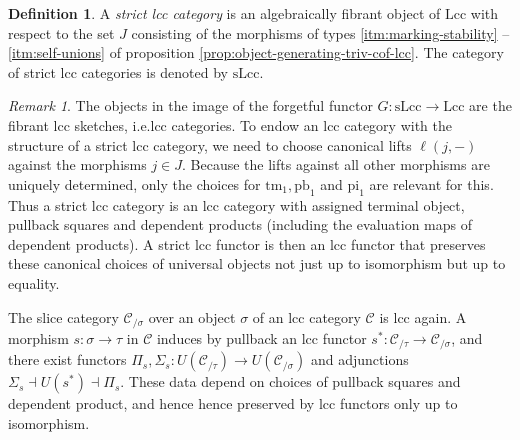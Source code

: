 \documentclass[a4paper]{article}
\theoremstyle{remark}
\newtheorem{remark}[theorem]{Remark}
\theoremstyle{definition}
\newtheorem{definition}[theorem]{Definition}
\begin{document}
\begin{definition}
  A \emph{strict lcc category} is an algebraically fibrant object of $\mathrm{Lcc}$ with respect to the set $J$ consisting of the morphisms of types \ref{itm:marking-stability} -- \ref{itm:self-unions} of proposition \ref{prop:object-generating-triv-cof-lcc}.
  The category of strict lcc categories is denoted by $\mathrm{sLcc}$.
\end{definition}

\begin{remark}
  The objects in the image of the forgetful functor $G : \mathrm{sLcc} \rightarrow \mathrm{Lcc}$ are the fibrant lcc sketches, i.e.\@ lcc categories.
  To endow an lcc category with the structure of a strict lcc category, we need to choose canonical lifts $\ell(j, -)$ against the morphisms $j \in J$.
  Because the lifts against all other morphisms are uniquely determined, only the choices for $\mathrm{tm}_1, \mathrm{pb}_1$ and $\mathrm{pi}_1$ are relevant for this.
  Thus a strict lcc category is an lcc category with assigned terminal object, pullback squares and dependent products (including the evaluation maps of dependent products).
  A strict lcc functor is then an lcc functor that preserves these canonical choices of universal objects not just up to isomorphism but up to equality.
\end{remark}

The slice category $\mathcal{C}_{/ \sigma}$ over an object $\sigma$ of an lcc category $\mathcal{C}$ is lcc again.
A morphism $s : \sigma \rightarrow \tau$ in $\mathcal{C}$ induces by pullback an lcc functor $s^* : \mathcal{C}_{/ \tau} \rightarrow \mathcal{C}_{/ \sigma}$, and there exist functors $\Pi_s, \Sigma_s : U(\mathcal{C}_{/ \tau}) \rightarrow U(\mathcal{C}_{/ \sigma})$ and adjunctions $\Sigma_s \dashv U(s^*) \dashv \Pi_s$.
These data depend on choices of pullback squares and dependent product, and hence hence preserved by lcc functors only up to isomorphism.
\end{document}
